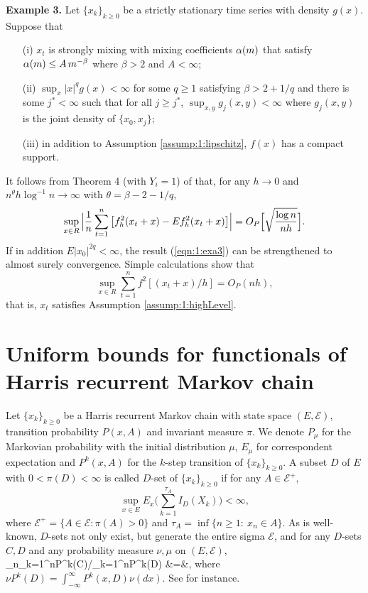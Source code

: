 \medskip
{\bf Example 3.}  Let $\{x_k\}_{k\ge0}$ be a strictly stationary time series with density $g(x)$. Suppose that
 \begin{itemize}
\item [(i)] $x_t$ is strongly mixing with mixing coefficients $\alpha(m)$ that satisfy  $\alpha(m) \le A\, m^{-\beta}$ where $\beta > 2 $ and $A < \infty$;
\item[(ii)] $\sup_x|x|^q g(x) < \infty$ for some $q\ge 1$ satisfying $\beta>2+1/q$ and there is some $j^* < \infty$ such that for all $j \ge j^*$, $\sup_{x, y} g_j(x, y) < \infty$ where $g_j(x, y)$ is the joint density of $\{x_0, x_j\}$;
\item[(iii)] in addition to Assumption \ref{assump:1:lipschitz}, $f(x)$ has a compact support.
\end{itemize}
 It follows from Theorem 4 (with $Y_i=1$) of \cite{hansen2008} that,
for any $h \rightarrow 0$ and $n^{\theta}h \log^{-1}n \rightarrow \infty$
with $\theta=\beta-2-1/q$,
\begin{equation}
\sup_{x \in  R} \Big | \frac{1}{n} \sum_{t =1}^{n} \big[f_h^2(x_t + x) - Ef_h^2(x_t + x)\big] \Big | = O_P \Big [\sqrt{\frac{\log n}{nh}}  \Big ]. \la {eqn:1:exa3}
\end{equation}
If in addition $E|x_0|^{2q}<\infty$, the result (\ref {eqn:1:exa3}) can be strengthened to  almost surely convergence. Simple calculations show that
\begin{equation}
\sup_{x \in  R} \sum_{t =1}^{n} f^2[(x_t + x)/h] = O_P(nh),
\end{equation}
that is, $x_t$ satisfies Assumption \ref{assump:1:highLevel}.


\section{Uniform bounds for functionals of Harris recurrent Markov chain} 

 Let $\{x_k\}_{k\ge 0}$ be a Harris recurrent Markov chain with state space $(E, \mathcal{E})$,
transition probability $P(x, A)$ and invariant measure $\pi$. We denote $P_\mu$ for the Markovian probability
with the initial distribution $\mu$, $E_\mu$ for correspondent expectation and $P^k(x, A)$
for the $k$-step transition of $\{x_k\}_{k\ge 0}$.  A subset $D$ of $E$ with $0<\pi(D)<\infty$ is called $D$-set of $\{x_k\}_{k\ge 0}$ if for any $A\in \mathcal{E}^+$,
$$
\sup_{x\in E} E_x\big(\sum_{k=1}^{\tau_A}I_D(X_k)\big)<\infty,
$$
where $ \mathcal{E}^+=\{A\in  \mathcal{E}: \pi(A)>0\}$ and $\tau_A=\inf\{n\ge 1: \ x_n\in A\}$. As is well-known,
$D$-sets not only exist,  but generate the entire sigma $\mathcal{E}$, and
 for any $D$-sets $C, D$ and any probability measure $\nu, \mu$ on $(E, \mathcal{E})$,
\be
\lim_{n\to\infty}\sum_{k=1}^n\nu P^k(C)/\sum_{k=1}^n\mu P^k(D) &=&, 
\ee
where $\nu P^k(D) =\int_{-\infty}^{\infty} P^k(x, D)\nu(dx)$. See \cite{nummelin2004} for instance.

